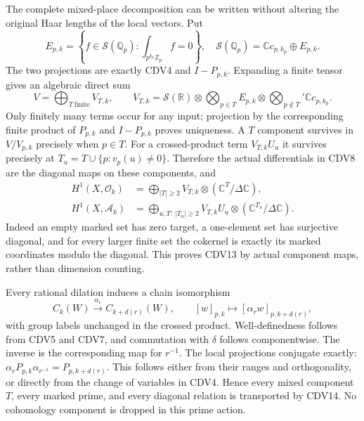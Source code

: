 The complete mixed-place decomposition can be written without altering
the original Haar lengths of the local vectors. Put
\begin{equation}\tag{CDV11}
 E_{p,k}=\left\{f\in\mathcal S(\mathbb Q_p):
                  \int_{p^{k_p}\mathbb Z_p}f=0\right\},\quad
 \mathcal S(\mathbb Q_p)=\mathbb Cc_{p,k_p}\oplus E_{p,k}.
\end{equation}
The two projections are exactly CDV4 and $I-P_{p,k}$. Expanding a
finite tensor gives an algebraic direct sum
\begin{equation}\tag{CDV12}
 V=\bigoplus_{T\ \mathrm{finite}}V_{T,k},\qquad
 V_{T,k}=\mathcal S(\mathbb R)\otimes
       \bigotimes_{p\in T}E_{p,k}\otimes
       \bigotimes_{p\notin T}'\mathbb Cc_{p,k_p}.
\end{equation}
Only finitely many terms occur for any input; projection by the
corresponding finite product of $P_{p,k}$ and $I-P_{p,k}$ proves
uniqueness. A $T$ component survives in $V/V_{p,k}$ precisely when
$p\in T$. For a crossed-product term $V_{T,k}U_u$ it survives
precisely at
$T_u=T\cup\{p:v_p(u)\ne0\}$. Therefore the actual differentials
in CDV8 are the diagonal maps on these components, and
\begin{equation}\tag{CDV13}
\begin{split}
 H^1(X,\mathcal O_k)
  &=\bigoplus_{|T|\ge2}
          V_{T,k}\otimes(\mathbb C^T/\Delta\mathbb C),\\
 H^1(X,\mathcal A_k)
  &=\bigoplus_{u,T:\ |T_u|\ge2}
          V_{T,k}U_u\otimes(\mathbb C^{T_u}/\Delta\mathbb C).
\end{split}
\end{equation}
Indeed an empty marked set has zero target, a one-element set has
surjective diagonal, and for every larger finite set the cokernel is
exactly its marked coordinates modulo the diagonal. This proves
CDV13 by actual component maps, rather than dimension counting.

Every rational dilation induces a chain isomorphism
\begin{equation}\tag{CDV14}
 C_k(W)\xrightarrow{\alpha_r}C_{k+d(r)}(W),\qquad
 [w]_{p,k}\longmapsto[\alpha_rw]_{p,k+d(r)},
\end{equation}
with group labels unchanged in the crossed product. Well-definedness
follows from CDV5 and CDV7, and commutation with $\delta$ follows
componentwise. The inverse is the corresponding map for $r^{-1}$.
The local projections conjugate exactly:
$\alpha_rP_{p,k}\alpha_{r^{-1}}=P_{p,k+d(r)}$.
This follows either from their ranges and orthogonality, or directly
from the change of variables in CDV4. Hence every mixed component
$T$, every marked prime, and every diagonal relation is transported
by CDV14. No cohomology component is dropped in this prime action.

